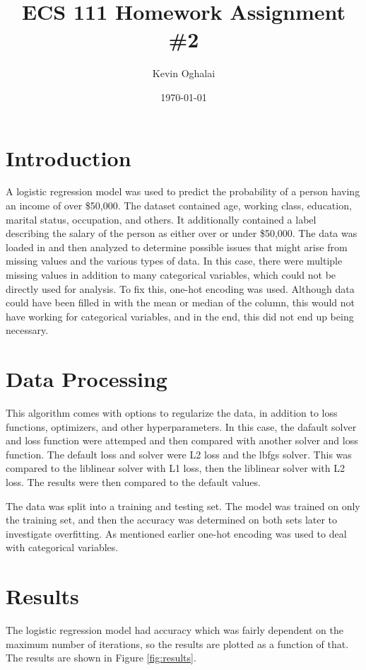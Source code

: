 \documentclass[12pt]{article}
\title{ECS 111 Homework Assignment \#2}
\author{Kevin Oghalai}
\date{\today}
\begin{document}
\maketitle
\section{Introduction}
A logistic regression model was used to predict the probability of 
a person having an income of over \$50,000. The dataset contained age, working class, 
education, marital status, occupation, and others. It additionally contained a 
label describing the salary of the person as either over or under \$50,000.
The data was loaded in and then analyzed 
to determine possible issues that might arise from
missing values and the various types of data. 
In this case, there were multiple missing values 
in addition to many categorical variables, which could not be 
directly used for analysis. To fix this, one-hot encoding was used. 
Although data could have been filled in with the mean or median of the 
column, this would not have working for categorical variables, and in the end,
this did not end up being necessary. 

\section{Data Processing}
This algorithm comes with
options to regularize the data, in addition to loss functions, optimizers, and other 
hyperparameters. In this case, the dafault solver and loss function were attemped and 
then compared with another solver
and loss function. The default loss and solver were L2 loss and the lbfgs solver. 
This was compared to the liblinear solver with L1 loss, then the liblinear
solver with L2 loss. The results were then compared to the default values.

The data was split into a training and testing set. The model was trained on 
only the training set, and then the accuracy was determined on both sets later  
to investigate overfitting. As mentioned earlier one-hot encoding was used to 
deal with categorical variables. 

\section{Results}
The logistic regression model had accuracy which was fairly dependent
on the maximum number of iterations, so the results are plotted as a function 
of that. The results are shown in Figure \ref{fig:results}.
\end{document}
